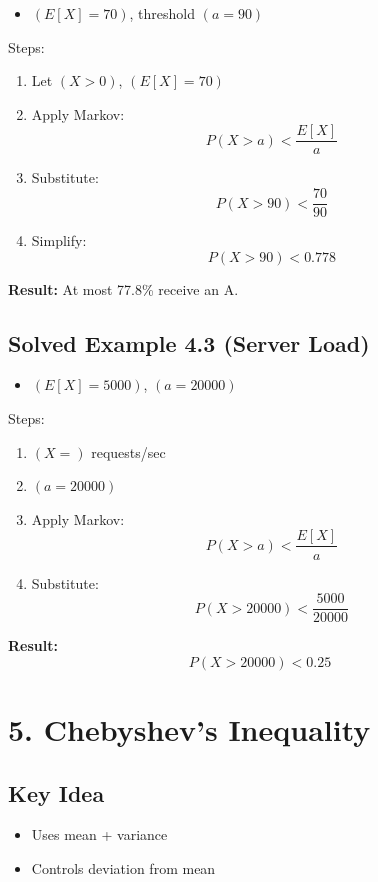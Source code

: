 \documentclass[11pt]{article}
\begin{document}
\begin{itemize}
\item $( E[X] = 70 )$, threshold $( a = 90 )$
\end{itemize}

Steps:

\begin{enumerate}
\item Let $( X > 0 )$, $( E[X] = 70 )$
\item Apply Markov:
\[
P(X > a) < \frac{E[X]}{a}
\]
\item Substitute:
\[
P(X > 90) < \frac{70}{90}
\]
\item Simplify:
\[
P(X > 90) < 0.778
\]
\end{enumerate}

\textbf{Result:} At most 77.8\% receive an A.

\subsection*{Solved Example 4.3 (Server Load)}

\begin{itemize}
\item $( E[X] = 5000 )$, $( a = 20000 )$
\end{itemize}

Steps:

\begin{enumerate}
\item $( X = )$ requests/sec
\item $( a = 20000 )$
\item Apply Markov:
\[
P(X > a) < \frac{E[X]}{a}
\]
\item Substitute:
\[
P(X > 20000) < \frac{5000}{20000}
\]
\end{enumerate}

\textbf{Result:}
\[
P(X > 20000) < 0.25
\]

\section*{5. Chebyshev’s Inequality}

\subsection*{Key Idea}

\begin{itemize}
\item Uses mean + variance
\item Controls deviation from mean
\end{itemize}
\end{document}
